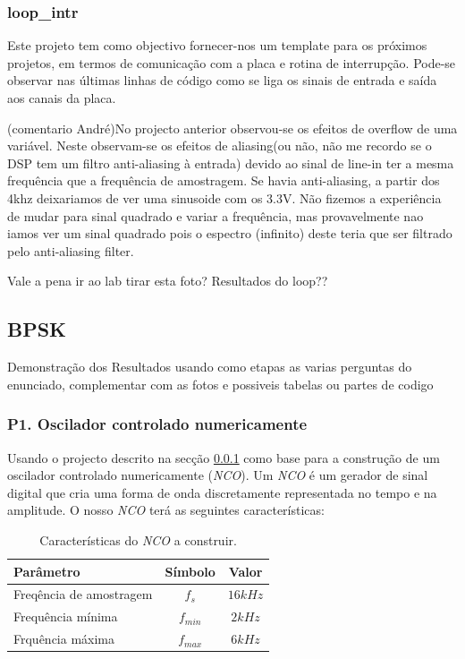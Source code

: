 \documentclass[11pt]{article}
\begin{document}
\subsubsection{loop\_intr}
\label{sec:loop}
Este projeto tem como objectivo fornecer-nos um template para os próximos projetos, em termos de comunicação com a placa e rotina de interrupção. Pode-se observar nas últimas linhas de código como se liga os sinais de entrada e saída aos canais da placa.

(comentario André)No projecto anterior observou-se os efeitos de overflow de uma variável. Neste observam-se os efeitos de aliasing(ou não, não me recordo se o DSP tem um filtro anti-aliasing à entrada)  devido ao sinal de line-in ter a mesma frequência que a frequência de amostragem. Se havia anti-aliasing, a partir dos 4khz deixariamos de ver uma sinusoide com os 3.3V. Não fizemos a experiência de mudar para sinal quadrado e variar a frequência, mas provavelmente nao iamos ver um sinal quadrado pois o espectro (infinito) deste teria que ser filtrado pelo anti-aliasing filter.

Vale a pena ir ao lab tirar esta foto?
Resultados do loop??

\subsection{BPSK}

 Demonstração dos Resultados usando como etapas as varias perguntas do enunciado, complementar com as fotos e possiveis tabelas ou partes de codigo

\subsubsection{P1. Oscilador controlado numericamente}

Usando o projecto descrito na secção \ref{sec:loop} como base para a construção de um oscilador controlado numericamente (\textit{NCO}). Um \textit{NCO} é um gerador de sinal digital que cria uma forma de onda discretamente representada no tempo e na amplitude. O nosso \textit{NCO} terá as seguintes características:

\begin{table}[H]
	\centering
	\caption{Características do \textit{NCO} a construir.}
	\label{tab:NCO-car}
\begin{tabular}[c]{|l||c|c|}
	\hline \textbf{Parâmetro} & \textbf{Símbolo} & \textbf{Valor} \\ 
	\hline Freqência de amostragem & $ f_{s} $ & $ 16 kHz $ \\ 
	\hline Frequência mínima & $ f_{min} $ & $ 2 kHz $ \\ 
	\hline Frquência máxima & $ f_{max} $ & $ 6 kHz $ \\ 
	\hline
\end{tabular}
\end{table}
\end{document}
